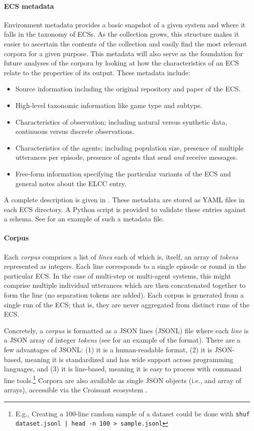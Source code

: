 \paragraph{ECS metadata}
Environment metadata provides a basic snapshot of a given system and where it falls in the taxonomy of ECSs.
As the collection grows, this structure makes it easier to ascertain the contents of the collection and easily find the most relevant corpora for a given purpose.
This metadata will also serve as the foundation for future analyses of the corpora by looking at how the characteristics of an ECS relate to the properties of its output.
These metadata include:
\begin{itemize}
  \item Source information including the original repository and paper of the ECS\@.
  \item High-level taxonomic information like game type and subtype.
  \item Characteristics of observation; including natural versus synthetic data, continuous versus discrete observations.
  \item Characteristics of the agents; including population size, presence of multiple utterances per episode, presence of agents that send \emph{and} receive messages.
  \item Free-form information specifying the particular variants of the ECS and general notes about the ELCC entry.
\end{itemize}
A complete description is given in .
These metadata are stored as YAML files in each ECS directory.
A Python script is provided to validate these entries against a schema.
See  for an example of such a metadata file.

\paragraph{Corpus}
Each \emph{corpus} comprises a list of \emph{lines} each of which is, itself, an array of \emph{tokens} represented as integers.
Each line corresponds to a single episode or round in the particular ECS.
In the case of multi-step or multi-agent systems, this might comprise multiple individual utterances which are then concatenated together to form the line (no separation tokens are added).
Each corpus is generated from a single run of the ECS; that is, they are never aggregated from distinct runs of the ECS\@.

Concretely, a \emph{corpus} is formatted as a JSON lines (JSONL) file where each \emph{line} is a JSON array of integer \emph{tokens} (see  for an example of the format).
There are a few advantages of JSONL:
  (1) it is a human-readable format,
  (2) it is JSON-based, meaning it is standardized and has wide support across programming languages,
  and (3) it is line-based, meaning it is easy to process with command line tools.\footnote{E.g., Creating a $100$-line random sample of a dataset could be done with \texttt{\small shuf dataset.jsonl | head -n 100 > sample.jsonl}}
Corpora are also available as single JSON objects (i.e., and array of arrays), accessible via the Croissant ecosystem \citep{croissant}.


